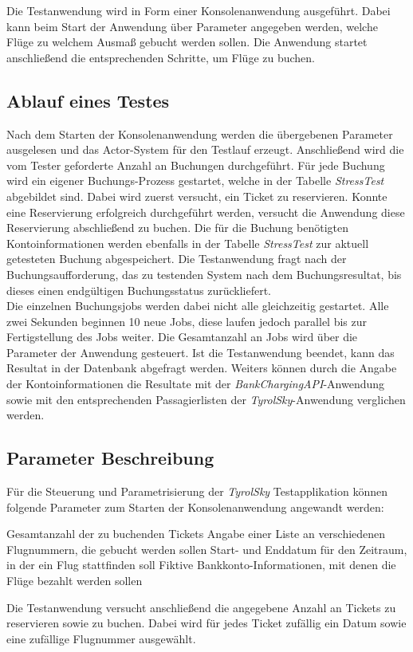 Die Testanwendung wird in Form einer Konsolenanwendung ausgeführt. Dabei kann beim Start der Anwendung über Parameter angegeben werden, welche Flüge zu welchem Ausmaß gebucht werden sollen. Die Anwendung startet anschließend die entsprechenden Schritte, um Flüge zu buchen. 

\subsection{Ablauf eines Testes}
Nach dem Starten der Konsolenanwendung werden die übergebenen Parameter ausgelesen und das Actor-System für den Testlauf erzeugt. Anschließend wird die vom Tester geforderte Anzahl an Buchungen durchgeführt. Für jede Buchung wird ein eigener Buchungs-Prozess gestartet, welche in der Tabelle \textit{StressTest} abgebildet sind. Dabei wird zuerst versucht, ein Ticket zu reservieren. Konnte eine Reservierung erfolgreich durchgeführt werden, versucht die Anwendung diese Reservierung abschließend zu buchen.
Die für die Buchung benötigten Kontoinformationen werden  ebenfalls in der Tabelle \textit{StressTest} zur aktuell getesteten Buchung abgespeichert. Die Testanwendung fragt nach der Buchungsaufforderung, das zu testenden System nach dem Buchungsresultat, bis dieses einen endgültigen Buchungsstatus zurückliefert. \\
Die einzelnen Buchungsjobs werden dabei nicht alle gleichzeitig gestartet. Alle zwei Sekunden beginnen 10 neue Jobs, diese laufen jedoch parallel bis zur Fertigstellung des Jobs weiter. Die Gesamtanzahl an Jobs wird über die Parameter der Anwendung gesteuert. Ist die Testanwendung beendet, kann das Resultat in der Datenbank abgefragt werden. Weiters können durch die Angabe der Kontoinformationen die Resultate mit der \textit{BankChargingAPI}-Anwendung sowie mit den entsprechenden Passagierlisten der \textit{TyrolSky}-Anwendung verglichen werden.

\subsection{Parameter Beschreibung}
Für die Steuerung und Parametrisierung der \textit{TyrolSky} Testapplikation können folgende Parameter zum Starten der Konsolenanwendung angewandt werden:

\begin{itemize}
     Gesamtanzahl der zu buchenden Tickets
     Angabe einer Liste an verschiedenen Flugnummern, die gebucht werden sollen
     Start- und Enddatum für den Zeitraum, in der ein Flug stattfinden soll
     Fiktive Bankkonto-Informationen, mit denen die Flüge bezahlt werden sollen
\end{itemize}
Die Testanwendung versucht anschließend die angegebene Anzahl an Tickets zu reservieren sowie zu buchen. Dabei wird für jedes Ticket zufällig ein Datum sowie eine zufällige Flugnummer ausgewählt. 
